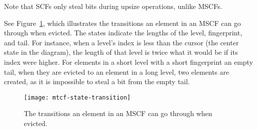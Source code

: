\documentclass[letterpaper,twocolumn,10pt]{article}
\newcommand{\ints}{\mathbb{Z}}
\newcommand{\dotcup}{\ensuremath{\mathaccent\cdot\cup}}
\newcommand{\TCF}{SCF}
\newcommand{\MTCF}{MSCF}
\newcommand{\TCF}{TCF}
\newcommand{\MTCF}{MTCF}
\begin{document}
Note that \TCF{}s only steal bits during upsize operations, unlike \MTCF{}s.

See Figure~\ref{mtcf-state-transition}, which illustrates the transitions an element in an \MTCF{} can go through when evicted.
The states indicate the lengths of the level, fingerprint, and tail.
For instance, when a level's index is less than the cursor (the center state in the diagram), the length of that level is twice what it would be if its index were higher.
For elements in a short level with a short fingerprint an empty tail, when they are evicted to an element in a long level, two elements are created, as it is impossible to steal a bit from the empty tail.


\begin{figure}[b!]
  \texttt{[image: mtcf-state-transition]}
\caption{\label{mtcf-state-transition}
The transitions an element in an \MTCF{} can go through when evicted.
}
\end{figure}


\end{document}
